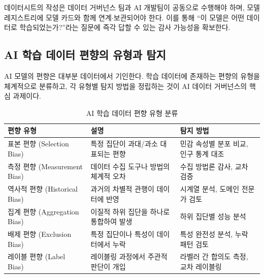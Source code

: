 데이터시트의 작성은 데이터 거버넌스 팀과 AI 개발팀이 공동으로 수행해야 하며, 모델 레지스트리에 모델 카드와 함께 연계$\cdot$보관되어야 한다. 이를 통해 ``이 모델은 어떤 데이터로 학습되었는가?''라는 질문에 즉각 답할 수 있는 감사 가능성을 확보한다.


\subsection{AI 학습 데이터 편향의 유형과 탐지}
\label{sec:9.1.4}

AI 모델의 편향은 대부분 데이터에서 기인한다. 학습 데이터에 존재하는 편향의 유형을 체계적으로 분류하고, 각 유형별 탐지 방법을 정립하는 것이 AI 데이터 거버넌스의 핵심 과제이다.

\begin{table}[htbp]
\centering
\caption{AI 학습 데이터 편향 유형 분류}
\label{tab:data_bias_types}
\begin{tabularx}{\textwidth}{p{2.5cm}Xp{3.5cm}}
\toprule
\textbf{편향 유형} & \textbf{설명} & \textbf{탐지 방법} \\
\midrule
표본 편향 (Selection Bias) & 특정 집단이 과대/과소 대표되는 편향 & 민감 속성별 분포 비교, 인구 통계 대조 \\
\midrule
측정 편향 (Measurement Bias) & 데이터 수집 도구나 방법의 체계적 오차 & 수집 방법론 감사, 교차 검증 \\
\midrule
역사적 편향 (Historical Bias) & 과거의 차별적 관행이 데이터에 반영 & 시계열 분석, 도메인 전문가 검토 \\
\midrule
집계 편향 (Aggregation Bias) & 이질적 하위 집단을 하나로 통합하여 발생 & 하위 집단별 성능 분석 \\
\midrule
배제 편향 (Exclusion Bias) & 특정 집단이나 특성이 데이터에서 누락 & 특성 완전성 분석, 누락 패턴 검토 \\
\midrule
레이블 편향 (Label Bias) & 레이블링 과정에서 주관적 판단이 개입 & 라벨러 간 합의도 측정, 교차 레이블링 \\
\bottomrule
\end{tabularx}
\end{table}

